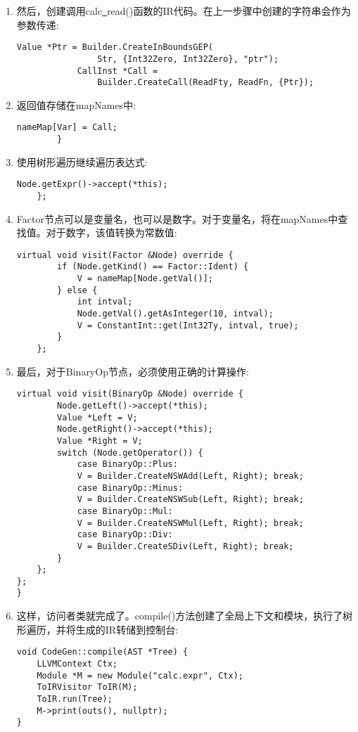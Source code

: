 \begin{enumerate}
\item 然后，创建调用calc\underline{~}read()函数的IR代码。在上一步骤中创建的字符串会作为参数传递:
\begin{lstlisting}[caption={}]
			Value *Ptr = Builder.CreateInBoundsGEP(
				Str, {Int32Zero, Int32Zero}, "ptr");
			CallInst *Call =
				Builder.CreateCall(ReadFty, ReadFn, {Ptr});
\end{lstlisting}

\item 返回值存储在mapNames中:
\begin{lstlisting}[caption={}]
			nameMap[Var] = Call;
		}
\end{lstlisting}

\item 使用树形遍历继续遍历表达式:
\begin{lstlisting}[caption={}]
		Node.getExpr()->accept(*this);
	};
\end{lstlisting}

\item Factor节点可以是变量名，也可以是数字。对于变量名，将在mapNames中查找值。对于数字，该值转换为常数值:
\begin{lstlisting}[caption={}]
	virtual void visit(Factor &Node) override {
		if (Node.getKind() == Factor::Ident) {
			V = nameMap[Node.getVal()];
		} else {
			int intval;
			Node.getVal().getAsInteger(10, intval);
			V = ConstantInt::get(Int32Ty, intval, true);
		}
	};
\end{lstlisting}

\item 最后，对于BinaryOp节点，必须使用正确的计算操作:
\begin{lstlisting}[caption={}]
	virtual void visit(BinaryOp &Node) override {
		Node.getLeft()->accept(*this);
		Value *Left = V;
		Node.getRight()->accept(*this);
		Value *Right = V;
		switch (Node.getOperator()) {
			case BinaryOp::Plus:
			V = Builder.CreateNSWAdd(Left, Right); break;
			case BinaryOp::Minus:
			V = Builder.CreateNSWSub(Left, Right); break;
			case BinaryOp::Mul:
			V = Builder.CreateNSWMul(Left, Right); break;
			case BinaryOp::Div:
			V = Builder.CreateSDiv(Left, Right); break;
		}
	};
};
}
\end{lstlisting}

\item 这样，访问者类就完成了。compile()方法创建了全局上下文和模块，执行了树形遍历，并将生成的IR转储到控制台:
\begin{lstlisting}[caption={}]
void CodeGen::compile(AST *Tree) {
	LLVMContext Ctx;
	Module *M = new Module("calc.expr", Ctx);
	ToIRVisitor ToIR(M);
	ToIR.run(Tree);
	M->print(outs(), nullptr);
}
\end{lstlisting}
\end{enumerate}

